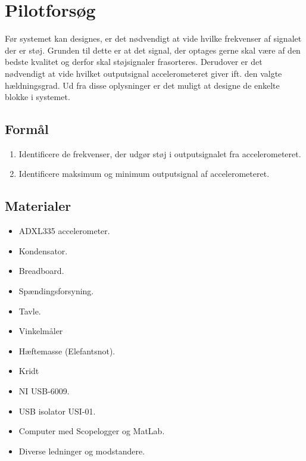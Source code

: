 \section{Pilotforsøg}
Før systemet kan designes, er det nødvendigt at vide hvilke frekvenser af signalet der er støj. Grunden til dette er at det signal, der optages gerne skal være af den bedste kvalitet og derfor skal støjsignaler frasorteres. Derudover er det nødvendigt at vide hvilket outputsignal accelerometeret giver ift. den valgte hældningsgrad. Ud fra disse oplysninger er det muligt at designe de enkelte blokke i systemet.%

\subsection{Formål}
\begin{enumerate}
\item Identificere de frekvenser, der udgør støj i outputsignalet fra accelerometeret.
\item Identificere maksimum og minimum outputsignal af accelerometeret.
\end{enumerate}

\subsection{Materialer}
\begin{itemize}
\item ADXL335 accelerometer.
\item Kondensator.
\item Breadboard.
\item Spændingsforsyning.
\item Tavle.
\item Vinkelmåler
\item Hæftemasse (Elefantsnot).
\item Kridt
\item NI USB-6009.
\item USB isolator USI-01.
\item Computer med Scopelogger og MatLab.
\item Diverse ledninger og modstandere.
\end{itemize}

